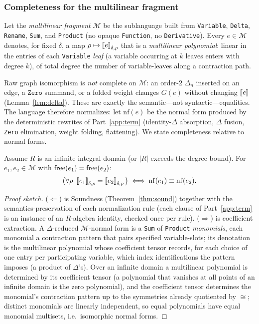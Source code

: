 \documentclass[sigplan,10pt,review]{acmart}
\begin{document}
\subsubsection*{Completeness for the multilinear fragment}

Let the \emph{multilinear fragment} $\mathcal{M}$ be the sublanguage
built from \texttt{Variable}, \texttt{Delta}, \texttt{Rename},
\texttt{Sum}, and \texttt{Product} (no opaque \texttt{Function}, no
\texttt{Derivative}). Every $e\in\mathcal{M}$ denotes, for fixed
$\delta$, a map $\rho\mapsto\left[\!\left[e\right]\!\right]_{\delta,\rho}$ that is a
\emph{multilinear polynomial}: linear in the entries of each
\texttt{Variable} \emph{leaf} (a variable occurring at $k$ leaves
enters with degree $k$), of total degree the number of variable-leaves
along a contraction path.

Raw graph isomorphism is \emph{not} complete on $\mathcal{M}$: an
order-$2$ $\Delta_n$ inserted on an edge, a $\texttt{Zero}$ summand, or a
folded weight changes $G(e)$ without changing $\left[\!\left[e\right]\!\right]$
(Lemma~\ref{lem:delta}). These are exactly the semantic---not
syntactic---equalities. The language therefore normalizes: let
$\mathrm{nf}(e)$ be the normal form produced by the deterministic
rewrites of Part~\ref{app:term} (identity-$\Delta$ absorption, $\Delta$
fusion, \texttt{Zero} elimination, weight folding, flattening). We state
completeness relative to normal forms.

\begin{proposition}\label{prop:complete}
Assume $R$ is an infinite integral domain (or $|R|$ exceeds the degree
bound). For $e_1,e_2\in\mathcal{M}$ with $\operatorname{free}(e_1)=\operatorname{free}(e_2)$:
\[
  \big(\forall\rho\ \sem{e_1}_{\delta,\rho}=\sem{e_2}_{\delta,\rho}\big)
  \iff \mathrm{nf}(e_1)\equiv \mathrm{nf}(e_2).
\]
\end{proposition}

\begin{proof}[Proof sketch]
($\Leftarrow$) is Soundness (Theorem~\ref{thm:sound}) together with the
semantics-preservation of each normalization rule (each clause of
Part~\ref{app:term} is an instance of an $R$-algebra identity, checked
once per rule). ($\Rightarrow$) is coefficient extraction. A
$\Delta$-reduced $\mathcal M$-normal form is a \texttt{Sum} of
\texttt{Product} \emph{monomials}, each monomial a contraction pattern
that pairs specified variable-slots; its denotation is the multilinear
polynomial whose coefficient tensor records, for each choice of one
entry per participating variable, which index identifications the pattern
imposes (a product of $\Delta$'s). Over an infinite domain a multilinear
polynomial is determined by its coefficient tensor (a polynomial that
vanishes at all points of an infinite domain is the zero polynomial), and
the coefficient tensor determines the monomial's contraction pattern up
to the symmetries already quotiented by $\cong$; distinct monomials are
linearly independent, so equal polynomials have equal monomial multisets,
i.e.\ isomorphic normal forms. \qedhere
\end{proof}
\end{document}
